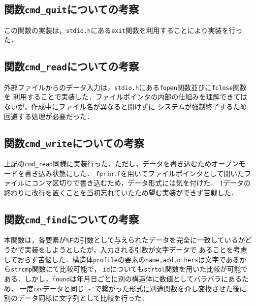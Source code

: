 \documentclass[a4j,11pt]{jarticle}
\begin{document}
\subsection{関数\texttt{cmd\_quit}についての考察}
この関数の実装は，\verb|stdio.h|にある\verb|exit|関数を利用することにより実装を行った．

\subsection{関数\texttt{cmd\_read}についての考察}
外部ファイルからのデータ入力は，\verb|stdio.h|にある\verb|fopen|関数並びに\verb|fclose|関数を
利用することで実装した．ファイルポインタの内部の仕組みを理解できてはないが，作成中にファイル名が異なると開けずに
システムが強制終了するため回避する処理が必要だった．

\subsection{関数\texttt{cmd\_write}についての考察}
上記の\verb|cmd_read|同様に実装行った．ただし，データを書き込むためオープンモードを書き込み状態にした．
\verb|fprintf|を用いてファイルポインタとして開いたファイルにコンマ区切りで書き込むため，データ形式には気を付けた．
1データの終わりに改行を置くことを当初忘れていたため望む実装ができず苦戦した．

\subsection{関数\texttt{cmd\_find}についての考察}
本関数は，各要素が\verb|%F|の引数として与えられたデータを完全に一致しているかどうかで実装をしようとしたが，入力される引数が文字データで
あることを考慮しておらず苦悩した．構造体\verb|profile|の要素の\verb|name,add,others|は文字であるから\verb|strcmp|関数にて比較可能で，
\verb|id|についても\verb|strtol|関数を用いた比較が可能である．しかし，\verb|found|は年月日ごとに別の構造体に数値としてバラバラにあるため，
一度csvデータと同じ\verb|'-'|で繋がった形式に別途関数を介し変換させた後に別のデータ同様に文字列として比較を行った．
\end{document}
